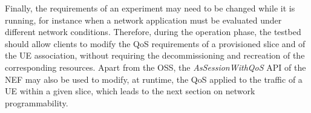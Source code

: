 Finally, the requirements of an experiment may need to be changed while it is running, for instance when a network application must be evaluated under different network conditions. Therefore, during the operation phase, the testbed should allow clients to modify the \acs{QoS} requirements of a provisioned slice and of the \acs{UE} association, without requiring the decommissioning and recreation of the corresponding resources. Apart from the \acs{OSS}, the \textit{AsSessionWithQoS} \acs{API} of the \acs{NEF} may also be used to modify, at runtime, the \acs{QoS} applied to the traffic of a \acs{UE} within a given slice, which leads to the next section on network programmability.
